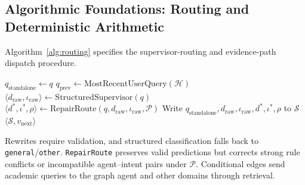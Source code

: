 \subsection{Algorithmic Foundations: Routing and Deterministic Arithmetic}
\label{sec:algorithms}

Algorithm~\ref{alg:routing} specifies the supervisor-routing and evidence-path dispatch procedure.

\begin{algorithm}[!htbp]
\footnotesize
\SetAlFnt{\footnotesize}
\SetAlCapFnt{\footnotesize}
\SetAlCapNameFnt{\footnotesize}
\SetAlgoVlined
\LinesNumbered
\caption{Supervisor Routing and Conditional Evidence-Path Dispatch}
\label{alg:routing}
$q_{\text{standalone}} \leftarrow q$\;
$q_{\mathrm{prev}} \leftarrow \mathrm{MostRecentUserQuery}(\mathcal{H})$\;
$\langle d_{\mathrm{raw}}, \iota_{\mathrm{raw}} \rangle \leftarrow \mathrm{StructuredSupervisor}(q)$\;
$\langle d^*, \iota^*, \rho \rangle \leftarrow \mathrm{RepairRoute}(q,d_{\mathrm{raw}},\iota_{\mathrm{raw}},\mathcal{P})$\;
Write $q_{\text{standalone}},d_{\mathrm{raw}},\iota_{\mathrm{raw}},d^*,\iota^*,\rho$ to $\mathcal{S}$\;
\Return $\langle \mathcal{S}, v_{\text{next}} \rangle$\;
\end{algorithm}

Rewrites require validation, and structured classification falls back to \texttt{general}/\texttt{other}. \texttt{RepairRoute} preserves valid predictions but corrects strong rule conflicts or incompatible agent--intent pairs under $\mathcal{P}$. Conditional edges send academic queries to the graph agent and other domains through retrieval.

